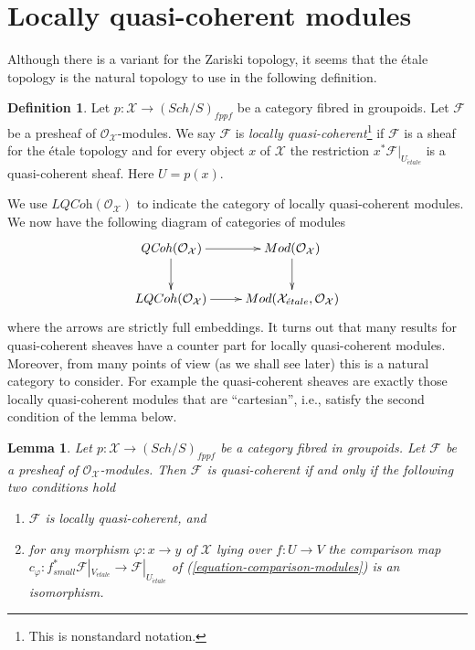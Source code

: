 \documentclass{stacks-project}
\theoremstyle{plain}
\newtheorem{lemma}[subsection]{Lemma}
\theoremstyle{definition}
\newtheorem{definition}[subsection]{Definition}
\theoremstyle{remark}
\numberwithin{equation}{subsection}
\def\Sch{\mathit{Sch}}
\def\etale{{\acute{e}tale}}
\def\QCoh{\mathit{QCoh}}
\begin{document}
\section{Locally quasi-coherent modules}
\label{section-locally-quasi-coherent}

\noindent
Although there is a variant for the Zariski topology, it seems
that the \'etale topology is the natural topology to use in the
following definition.

\begin{definition}
\label{definition-locally-quasi-coherent}
Let $p : \mathcal{X} \to (\Sch/S)_{fppf}$ be a category
fibred in groupoids. Let $\mathcal{F}$
be a presheaf of $\mathcal{O}_\mathcal{X}$-modules.
We say $\mathcal{F}$ is {\it locally quasi-coherent}\footnote{This is
nonstandard notation.} if
$\mathcal{F}$ is a sheaf for the \'etale topology and
for every object $x$ of $\mathcal{X}$ the restriction
$x^*\mathcal{F}|_{U_\etale}$ is a quasi-coherent
sheaf. Here $U = p(x)$.
\end{definition}

\noindent
We use $\textit{LQCoh}(\mathcal{O}_\mathcal{X})$ to indicate the category of
locally quasi-coherent modules. We now have the following diagram
of categories of modules
$$
\xymatrix{
\QCoh(\mathcal{O}_\mathcal{X}) \ar[r] \ar[d] &
\textit{Mod}(\mathcal{O}_\mathcal{X}) \ar[d] \\
\textit{LQCoh}(\mathcal{O}_\mathcal{X}) \ar[r] &
\textit{Mod}(\mathcal{X}_\etale, \mathcal{O}_\mathcal{X})
}
$$
where the arrows are strictly full embeddings.
It turns out that many results for quasi-coherent sheaves have a
counter part for locally quasi-coherent modules. Moreover, from many
points of view (as we shall see later) this is a natural category to consider.
For example the quasi-coherent sheaves are exactly those
locally quasi-coherent modules that are ``cartesian'', i.e., satisfy
the second condition of the lemma below.

\begin{lemma}
\label{lemma-quasi-coherent}
Let $p : \mathcal{X} \to (\Sch/S)_{fppf}$ be a category
fibred in groupoids. Let $\mathcal{F}$
be a presheaf of $\mathcal{O}_\mathcal{X}$-modules. Then $\mathcal{F}$
is quasi-coherent if and only if the following two conditions hold
\begin{enumerate}
\item $\mathcal{F}$ is locally quasi-coherent, and
\item for any morphism $\varphi : x \to y$ of $\mathcal{X}$ lying over
$f : U \to V$ the comparison map
$c_\varphi : f_{small}^*\mathcal{F}|_{V_\etale} \to
\mathcal{F}|_{U_\etale}$ of
(\ref{equation-comparison-modules}) is an isomorphism.
\end{enumerate}
\end{lemma}
\end{document}
